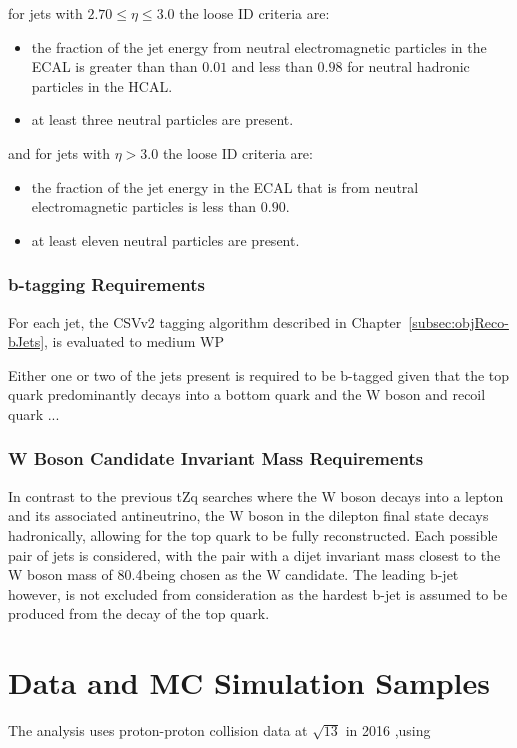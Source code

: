 for jets with $ 2.70 \leq \eta \leq 3.0$ the loose ID criteria are:
\begin{itemize}
\item the fraction of the jet energy from neutral electromagnetic particles in the ECAL is greater than than $0.01$ and less than $0.98$ for neutral hadronic particles in the HCAL.
\item at least three neutral particles are present.
\end{itemize}

and for jets with $\eta > 3.0$ the loose ID criteria are:
\begin{itemize}
\item the fraction of the jet energy in the ECAL that is from neutral electromagnetic particles is less than $0.90$.
\item at least eleven neutral particles are present.
\end{itemize}

\subsubsection{b-tagging Requirements}
For each jet, the CSVv2 tagging algorithm described in Chapter~\ref{subsec:objReco-bJets}, is evaluated to medium WP

Either one or two of the jets present is required to be b-tagged given that the top quark predominantly decays into a bottom quark and the W boson and recoil quark ... 

\subsubsection{W Boson Candidate Invariant Mass Requirements}
In contrast to the previous tZq searches where the W boson decays into a lepton and its associated antineutrino, the W boson in the dilepton final state decays hadronically, allowing for the top quark to be fully reconstructed.
Each possible pair of jets is considered, with the pair with a dijet invariant mass closest to the W boson mass of 80.4\GeVcc being chosen as the W candidate.
The leading b-jet however, is not excluded from consideration as the hardest b-jet is assumed to be produced from the decay of the top quark. 

\section{Data and MC Simulation Samples}
The analysis uses proton-proton collision data at $\sqrt{13}$ in 2016 ,using 

